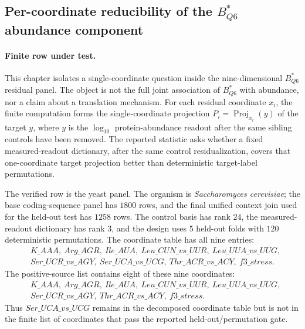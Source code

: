 \subsection{Per-coordinate reducibility of the $B^\ast_{Q6}$ abundance component}\label{sec:b-star-q6-per-coordinate-reducibility}

\paragraph{Finite row under test.}  This chapter isolates a single-coordinate question inside the nine-dimensional $B^\ast_{Q6}$ residual panel.  The object is not the full joint association of $B^\ast_{Q6}$ with abundance, nor a claim about a translation mechanism.  For each residual coordinate $x_i$, the finite computation forms the single-coordinate projection $P_i=\operatorname{Proj}_{x_i}(y)$ of the target $y$, where $y$ is the $\log_{10}$ protein-abundance readout after the same sibling controls have been removed.  The reported statistic asks whether a fixed measured-readout dictionary, after the same control residualization, covers that one-coordinate target projection better than deterministic target-label permutations.

The verified row is the yeast panel.  The organism is \emph{Saccharomyces cerevisiae}; the base coding-sequence panel has $1800$ rows, and the final unified context join used for the held-out test has $1258$ rows.  The control basis has rank $24$, the measured-readout dictionary has rank $3$, and the design uses $5$ held-out folds with $120$ deterministic permutations.  The coordinate table has all nine entries:
$$
\begin{aligned}
&K\_AAA,\ Arg\_AGR,\ Ile\_AUA,\ Leu\_CUN\_vs\_UUR,\ Leu\_UUA\_vs\_UUG,\\
&Ser\_UCR\_vs\_AGY,\ Ser\_UCA\_vs\_UCG,\ Thr\_ACR\_vs\_ACY,\ f3\_stress.
\end{aligned}
$$
The positive-source list contains eight of these nine coordinates:
$$
\begin{aligned}
&K\_AAA,\ Arg\_AGR,\ Ile\_AUA,\ Leu\_CUN\_vs\_UUR,\ Leu\_UUA\_vs\_UUG,\\
&Ser\_UCR\_vs\_AGY,\ Thr\_ACR\_vs\_ACY,\ f3\_stress.
\end{aligned}
$$
Thus $Ser\_UCA\_vs\_UCG$ remains in the decomposed coordinate table but is not in the finite list of coordinates that pass the reported held-out/permutation gate.

